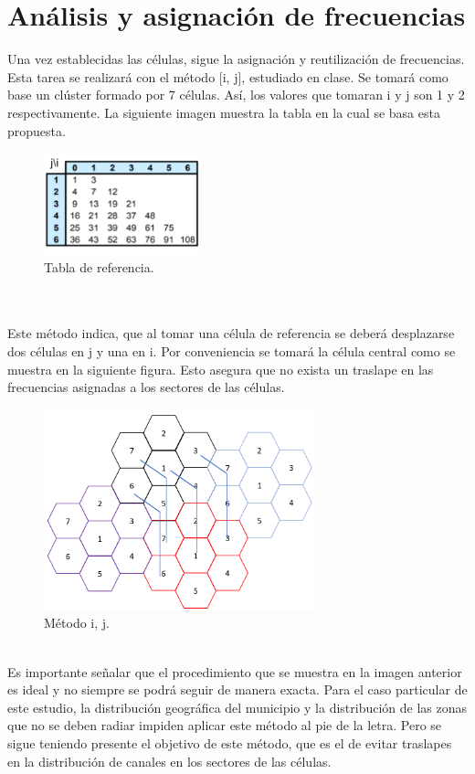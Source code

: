 \documentclass[11pt,letterpaper]{article}
\begin{document}
\newpage
\section{Análisis y asignación de frecuencias}
Una vez establecidas las células, sigue la asignación y reutilización de frecuencias. 
Esta tarea se realizará con el método [i, j], estudiado en clase. Se tomará como base 
un clúster formado por 7 células. Así, los valores que tomaran i y j son 1 y 2 
respectivamente. La siguiente imagen muestra la tabla en la cual se basa esta propuesta.
\begin{figure}[ht]
    \centering
    \includegraphics[width=0.4\textwidth]{imagenes/t22.png}
    \caption{Tabla de referencia.}
\end{figure}
\\ \\
Este método indica, que al tomar una célula de referencia se deberá desplazarse dos 
células en j y una en i. Por conveniencia se tomará la célula central como se muestra 
en la siguiente figura. Esto asegura que no exista un traslape en las frecuencias 
asignadas a los sectores de las células.
\begin{figure}[ht]
    \centering
    \includegraphics[width=0.7\textwidth]{imagenes/t23.png}
    \caption{Método i, j.}
\end{figure}
\\
Es importante señalar que el procedimiento que se muestra en la imagen anterior es 
ideal y no siempre se podrá seguir de manera exacta. Para el caso particular de este 
estudio, la distribución geográfica del municipio y la distribución de las zonas que 
no se deben radiar impiden aplicar este método al pie de la letra. Pero se sigue teniendo 
presente el objetivo de este método, que es el de evitar traslapes en la distribución de 
canales en los sectores de las células.
\end{document}
